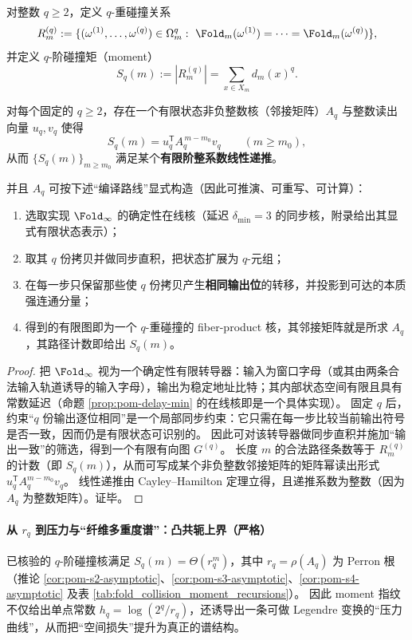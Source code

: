 \begin{definition}\label{def:pom-moment-q}
对整数 \(q\ge 2\)，定义 \(q\)-重碰撞关系
$$
R_m^{(q)}:=
\{(\omega^{(1)},\dots,\omega^{(q)})\in\Omega_m^q:\ \Fold_m(\omega^{(1)})=\cdots=\Fold_m(\omega^{(q)})\},
$$
并定义 \(q\)-阶碰撞矩（moment）
$$
S_q(m):=|R_m^{(q)}|=\sum_{x\in X_m} d_m(x)^q.
$$
\end{definition}

\begin{proposition}\label{prop:pom-moment-kernel-exists}
对每个固定的 \(q\ge 2\)，存在一个有限状态非负整数核（邻接矩阵）\(A_q\) 与整数读出向量 \(u_q,v_q\) 使得
$$
S_q(m)=u_q^{\mathsf T}A_q^{\,m-m_0}v_q\qquad(m\ge m_0),
$$
从而 \(\{S_q(m)\}_{m\ge m_0}\) 满足某个\textbf{有限阶整系数线性递推}。

并且 \(A_q\) 可按下述“编译路线”显式构造（因此可推演、可重写、可计算）：
\begin{enumerate}
  \item 选取实现 \(\Fold_\infty\) 的确定性在线核（延迟 \(\delta_{\min}=3\) 的同步核，附录给出其显式有限状态表示）；
  \item 取其 \(q\) 份拷贝并做同步直积，把状态扩展为 \(q\)-元组；
  \item 在每一步只保留那些使 \(q\) 份拷贝产生\textbf{相同输出位}的转移，并投影到可达的本质强连通分量；
  \item 得到的有限图即为一个 \(q\)-重碰撞的 fiber-product 核，其邻接矩阵就是所求 \(A_q\)，其路径计数即给出 \(S_q(m)\)。
\end{enumerate}
\end{proposition}

\begin{proof}
把 \(\Fold_\infty\) 视为一个确定性有限转导器：输入为窗口字母（或其由两条合法输入轨道诱导的输入字母），输出为稳定地址比特；其内部状态空间有限且具有常数延迟（命题 \ref{prop:pom-delay-min} 的在线核即是一个具体实现）。
固定 \(q\) 后，约束“\(q\) 份输出逐位相同”是一个局部同步约束：它只需在每一步比较当前输出符号是否一致，因而仍是有限状态可识别的。
因此可对该转导器做同步直积并施加“输出一致”的筛选，得到一个有限有向图 \(G^{(q)}\)。
长度 \(m\) 的合法路径条数等于 \(R_m^{(q)}\) 的计数（即 \(S_q(m)\)），从而可写成某个非负整数邻接矩阵的矩阵幂读出形式 \(u_q^{\mathsf T}A_q^{m-m_0}v_q\)。
线性递推由 Cayley--Hamilton 定理立得，且递推系数为整数（因为 \(A_q\) 为整数矩阵）。证毕。
\end{proof}

\paragraph{从 \texorpdfstring{$r_q$}{r\_q} 到压力与“纤维多重度谱”：凸共轭上界（严格）}
已核验的 \(q\)-阶碰撞核满足 \(S_q(m)=\Theta(r_q^m)\)，其中 \(r_q=\rho(A_q)\) 为 Perron 根（推论 \ref{cor:pom-s2-asymptotic}、\ref{cor:pom-s3-asymptotic}、\ref{cor:pom-s4-asymptotic} 及表 \ref{tab:fold_collision_moment_recursions}）。
因此 moment 指纹不仅给出单点常数 \(h_q=\log(2^q/r_q)\)，还诱导出一条可做 Legendre 变换的“压力曲线”，从而把“空间损失”提升为真正的谱结构。

